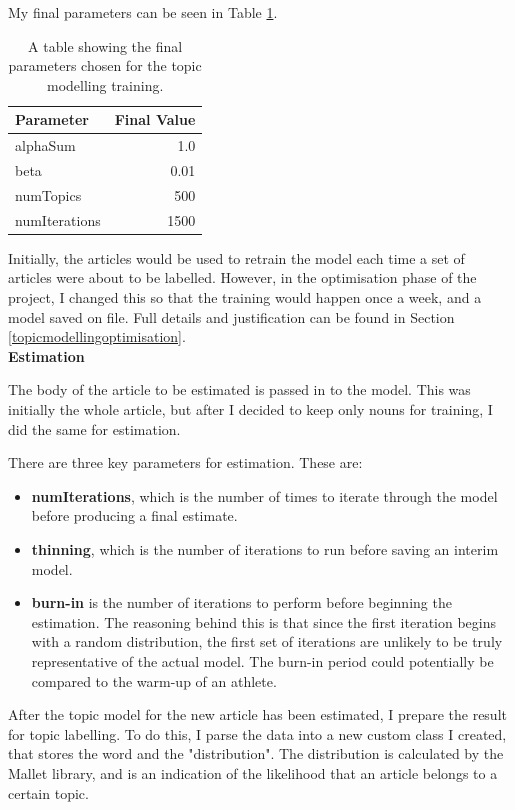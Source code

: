 \documentclass[12pt]{article}
\begin{document}
My final parameters can be seen in Table \ref{topicmodellingtraining}.

\begin{table}[H]
	\centering
	\begin{tabular}{l|r}
		\textbf{Parameter} & \textbf{Final Value} \\ \hline
		alphaSum & 1.0 \\ \hline
		beta & 0.01 \\ \hline
		numTopics & 500 \\ \hline
		numIterations & 1500 \\ \hline
	\end{tabular}
	\caption[Parameters for training topic models]{A table showing the final parameters chosen for the topic modelling training.}
	\label{topicmodellingtraining}
\end{table}

Initially, the articles would be used to retrain the model each time a set of articles were about to be labelled. However, in the optimisation phase of the project, I changed this so that the training would happen once a week, and a model saved on file. Full details and justification can be found in Section \ref{topicmodellingoptimisation}. \\

\textbf{Estimation}

The body of the article to be estimated is passed in to the model. This was initially the whole article, but after I decided to keep only nouns for training, I did the same for estimation. 

There are three key parameters for estimation. These are:

\begin{itemize}
	\item \textbf{numIterations}, which is the number of times to iterate through the model before producing a final estimate. 
	\item \textbf{thinning}, which is the number of iterations to run before saving an interim model.
	\item \textbf{burn-in} is the number of iterations to perform before beginning the estimation. The reasoning behind this is that since the first iteration begins with a random distribution, the first set of iterations are unlikely to be truly representative of the actual model. The burn-in period could potentially be compared to the warm-up of an athlete. 
\end{itemize}

After the topic model for the new article has been estimated, I prepare the result for topic labelling. To do this, I parse the data into a new custom class I created, that stores the word and the "distribution". The distribution is calculated by the Mallet library, and is an indication of the likelihood that an article belongs to a certain topic.
\end{document}
